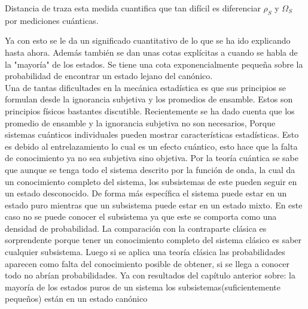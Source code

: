 Distancia de traza esta medida cuantifica que tan difícil es diferenciar $\rho_{S}$ y $\Omega_{S}$ por mediciones cuánticas.

Ya con esto se le da un significado cuantitativo de lo que se ha ido explicando hasta ahora. Además también se dan unas cotas explícitas a cuando se habla de la "mayoría" de los estados. Se tiene una cota exponencialmente pequeña  sobre la probabilidad de encontrar un estado lejano del canónico.\\ %

Una de tantas dificultades en la mecánica estadística es que sus principios se formulan desde la ignorancia subjetiva y los promedios de ensamble. Estos son principios físicos bastantes discutible.
Recientemente se ha dado cuenta que los promedio de ensamble y la ignorancia subjetiva no son necesarios, Porque sistemas cuánticos individuales pueden mostrar características estadísticas. Esto es debido al entrelazamiento lo cual es un efecto cuántico, esto hace que la falta de conocimiento ya no sea subjetiva sino objetiva. Por la teoría cuántica se sabe que aunque se tenga todo el sistema descrito por la función de onda, la cual da un conocimiento completo del sistema, los subsistemas de este pueden seguir en un estado desconocido. De forma más específica el sistema puede estar en un estado puro mientras que un subsistema puede estar en un estado mixto. En este caso no se puede conocer el subsistema ya que este se comporta como una densidad de probabilidad. La comparación con la contraparte clásica es sorprendente porque tener un conocimiento completo del sistema clásico es saber cualquier subsistema. Luego si se aplica una teoría clásica las probabilidades aparecen como falta del conocimiento posible de obtener, si se llega a conocer todo no abrían probabilidades.
Ya con resultados del capítulo anterior sobre: la mayoría de los estados puros de un sistema los subsistemas(suficientemente pequeños) están en un estado canónico




